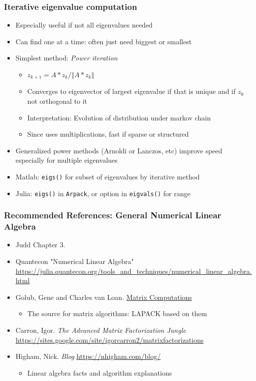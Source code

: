 \documentclass[bigger]{beamer}
\begin{document}
\begin{frame}%
\frametitle{Iterative eigenvalue computation}

\begin{itemize}


\item Especially useful if not all eigenvalues needed
\item Can find one at a time: often just need biggest or smallest
\item Simplest method: \emph{Power iteration}
\begin{itemize}
\item $z_{k+1}=A*z_{k}/\left\Vert A*z_{k}\right\Vert$
\item Converges to eigenvector of largest eigenvalue if that is unique and if $z_0$ not orthogonal to it
\item Interpretation: Evolution of distribution under markov chain
\item Since uses multiplications, fast if sparse or structured
\end{itemize}
\item Generalized power methods (Arnoldi or Lanczos, etc) improve speed especially for multiple eigenvalues 
\item Matlab: \texttt{eigs()} for subset of eigenvalues by iterative method
\item Julia: \texttt{eigs()} in \texttt{Arpack}, or option in \texttt{eigvals()} for range


\end{itemize}

\end{frame}%


\begin{frame}%
\frametitle{Recommended References: General Numerical Linear Algebra }


\begin{itemize}

\item Judd Chapter 3.
\item Quantecon "Numerical Linear Algebra" \url{https://julia.quantecon.org/tools_and_techniques/numerical_linear_algebra.html}
\item Golub, Gene and Charles van Loan. \underline{Matrix Computations}
\begin{itemize}
\item The source for matrix algorithms: LAPACK based on them
\end{itemize}
\item Carron, Igor. \emph{The Advanced Matrix Factorization Jungle} \url{https://sites.google.com/site/igorcarron2/matrixfactorizations}
\item Higham, Nick. \emph{Blog} \url{https://nhigham.com/blog/}
\begin{itemize}
\item Linear algebra facts and algorithm explanations
\end{itemize}


\end{itemize}


\end{frame}
\end{document}
